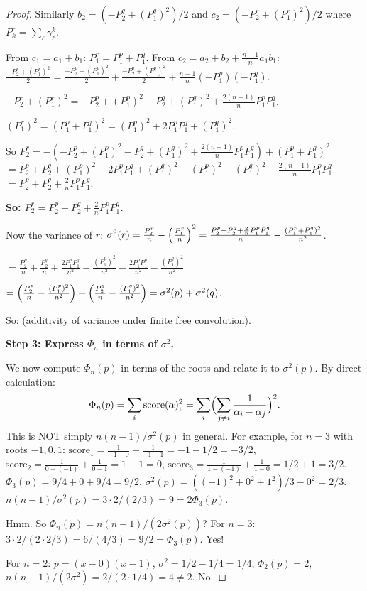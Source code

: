\documentclass[12pt]{article}
\theoremstyle{definition}
\newcommand{\score}{\mathrm{score}}
\begin{document}
\begin{proof}
Similarly $b_2=(-P_2^q+(P_1^q)^2)/2$ and $c_2=(-P_2^r+(P_1^r)^2)/2$ where $P_k^r=\sum_\ell\gamma_\ell^k$.

From $c_1=a_1+b_1$: $P_1^r=P_1^p+P_1^q$.
From $c_2=a_2+b_2+\frac{n-1}{n}a_1b_1$:
$\frac{-P_2^r+(P_1^r)^2}{2}=\frac{-P_2^p+(P_1^p)^2}{2}+\frac{-P_2^q+(P_1^q)^2}{2}+\frac{n-1}{n}(-P_1^p)(-P_1^q)$.

$-P_2^r+(P_1^r)^2=-P_2^p+(P_1^p)^2-P_2^q+(P_1^q)^2+\frac{2(n-1)}{n}P_1^pP_1^q$.

$(P_1^r)^2=(P_1^p+P_1^q)^2=(P_1^p)^2+2P_1^pP_1^q+(P_1^q)^2$.

So $P_2^r=-(-P_2^p+(P_1^p)^2-P_2^q+(P_1^q)^2+\frac{2(n-1)}{n}P_1^pP_1^q)+(P_1^p+P_1^q)^2$
$=P_2^p+P_2^q+(P_1^p)^2+2P_1^pP_1^q+(P_1^q)^2-(P_1^p)^2-(P_1^q)^2-\frac{2(n-1)}{n}P_1^pP_1^q$
$=P_2^p+P_2^q+\frac{2}{n}P_1^pP_1^q$.

\textbf{So: $P_2^r=P_2^p+P_2^q+\frac{2}{n}P_1^pP_1^q$.}

Now the variance of $r$:
$\sigma^2(r)=\frac{P_2^r}{n}-\Bigl(\frac{P_1^r}{n}\Bigr)^2=\frac{P_2^p+P_2^q+\frac{2}{n}P_1^pP_1^q}{n}-\frac{(P_1^p+P_1^q)^2}{n^2}$.

$=\frac{P_2^p}{n}+\frac{P_2^q}{n}+\frac{2P_1^pP_1^q}{n^2}-\frac{(P_1^p)^2}{n^2}-\frac{2P_1^pP_1^q}{n^2}-\frac{(P_1^q)^2}{n^2}$

$=\Bigl(\frac{P_2^p}{n}-\frac{(P_1^p)^2}{n^2}\Bigr)+\Bigl(\frac{P_2^q}{n}-\frac{(P_1^q)^2}{n^2}\Bigr)=\sigma^2(p)+\sigma^2(q)$.

So:  (additivity of variance under finite free convolution).

\textbf{Step 3: Express $\Phi_n$ in terms of $\sigma^2$.}

We now compute $\Phi_n(p)$ in terms of the roots and relate it to $\sigma^2(p)$.  By direct
calculation:
\[
  \Phi_n(p)=\sum_i\score(\alpha)_i^2=\sum_i\Bigl(\sum_{j\neq i}\frac{1}{\alpha_i-\alpha_j}\Bigr)^2.
\]
This is NOT simply $n(n-1)/\sigma^2(p)$ in general.  For example, for $n=3$ with roots $-1,0,1$:
$\score_1=\frac{1}{-1-0}+\frac{1}{-1-1}=-1-1/2=-3/2$,
$\score_2=\frac{1}{0-(-1)}+\frac{1}{0-1}=1-1=0$,
$\score_3=\frac{1}{1-(-1)}+\frac{1}{1-0}=1/2+1=3/2$.
$\Phi_3(p)=9/4+0+9/4=9/2$.
$\sigma^2(p)=((-1)^2+0^2+1^2)/3-0^2=2/3$.
$n(n-1)/\sigma^2(p)=3\cdot 2/(2/3)=9=2\Phi_3(p)$.

Hmm. So $\Phi_n(p)=n(n-1)/(2\sigma^2(p))$?  For $n=3$: $3\cdot 2/(2\cdot 2/3)=6/(4/3)=9/2=\Phi_3(p)$. Yes!

For $n=2$: $p=(x-0)(x-1)$, $\sigma^2=1/2-1/4=1/4$, $\Phi_2(p)=2$,
$n(n-1)/(2\sigma^2)=2/(2\cdot 1/4)=4\neq 2$. No.


\end{proof}
\end{document}
